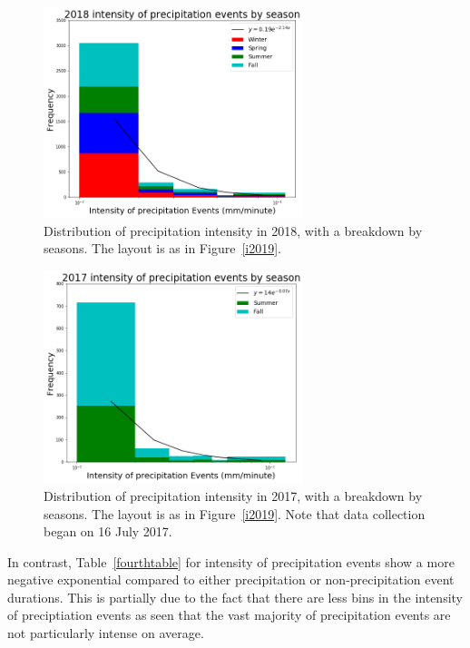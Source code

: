 \documentclass[11pt]{report}
\begin{document}
\clearpage
\begin{figure}[t]
\centering
\includegraphics[width=0.675\textwidth]{Figures/inten2018.png}
\caption[Intensity histogram for 2018 broken down by season]
        {\label{i2018}Distribution of precipitation intensity in 2018,
          with a breakdown by seasons. The layout is as in
          Figure~\ref{i2019}.}
\end{figure}

\begin{figure}[b]
\centering
\includegraphics[width=0.675\textwidth]{Figures/inten2017.png}
\caption[Intensity histogram for 2017 broken down by season]
        {\label{i2017}Distribution of precipitation intensity in 2017,
          with a breakdown by seasons. The layout is as in
          Figure~\ref{i2019}. Note that data collection began on 16
          July 2017.}
\end{figure}
\clearpage




In contrast, Table~\ref{fourthtable} for intensity of precipitation events show a more negative exponential compared to either precipitation or non-precipitation event durations. This is partially due to the fact that there are less bins in the intensity of preciptiation events as seen that the vast majority of precipitation events are not particularly intense on average. 
\end{document}
